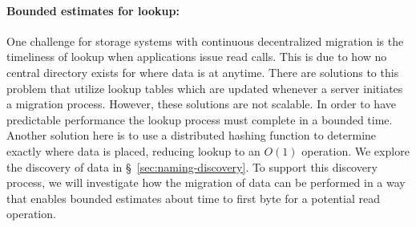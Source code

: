 \paragraph{Bounded estimates for lookup:}
One challenge for storage systems with continuous decentralized migration is
the timeliness of lookup when applications issue read calls. This is due to
how no central directory exists for where data is at anytime. There are
solutions to this problem that utilize lookup tables which are updated
whenever a server initiates a migration process. However, these solutions
are not scalable. In order to have predictable performance the lookup
process must complete in a bounded time. Another solution here is to use a
distributed hashing function to determine exactly where data is placed,
reducing lookup to an $O(1)$ operation. We explore the discovery of data in
\S~\ref{sec:naming-discovery}. To support this discovery process, we will
investigate how the migration of data can be performed in a way that enables
bounded estimates about time to first byte for a potential read operation.






